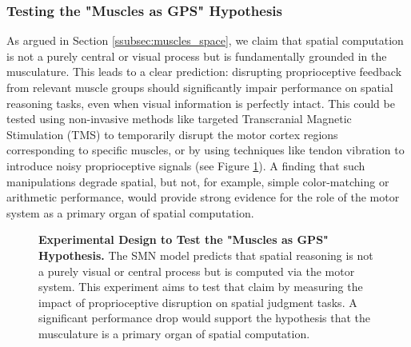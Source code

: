 \subsubsection{Testing the "Muscles as GPS" Hypothesis}
\label{ssubsec:gps_test}
As argued in Section \ref{ssubsec:muscles_space}, we claim that spatial computation is not a purely central or visual process but is fundamentally grounded in the musculature. This leads to a clear prediction: disrupting proprioceptive feedback from relevant muscle groups should significantly impair performance on spatial reasoning tasks, even when visual information is perfectly intact. This could be tested using non-invasive methods like targeted Transcranial Magnetic Stimulation (TMS) to temporarily disrupt the motor cortex regions corresponding to specific muscles, or by using techniques like tendon vibration to introduce noisy proprioceptive signals (see Figure \ref{fig:gps_experiment}). A finding that such manipulations degrade spatial, but not, for example, simple color-matching or arithmetic performance, would provide strong evidence for the role of the motor system as a primary organ of spatial computation.

\begin{figure}[ht]
    \centering
    \caption{\textbf{Experimental Design to Test the "Muscles as GPS" Hypothesis.} The SMN model predicts that spatial reasoning is not a purely visual or central process but is computed via the motor system. This experiment aims to test that claim by measuring the impact of proprioceptive disruption on spatial judgment tasks. A significant performance drop would support the hypothesis that the musculature is a primary organ of spatial computation.}
    \label{fig:gps_experiment}
\end{figure}

